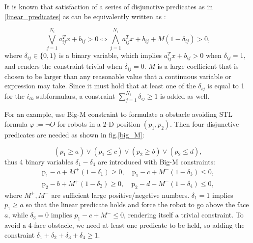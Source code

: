 \documentclass[a4paper]{report}
\begin{document}

It is known that satisfaction of a series of disjunctive predicates as in \ref*{linear_predicates} as can be equivalently written as \cite{Maryam2019}:

\begin{equation}
\bigvee_{j=1}^{N_i} a_{ij}^Tx+b_{ij}>0 \Leftrightarrow \bigwedge_{j=1}^{N_i}a_{ij}^Tx+b_{ij}+M(1-\delta_{ij})>0,
\end{equation}
where $\delta_{ij} \in \{0,1\}$ is a binary variable, which implies $a_{ij}^Tx+b_{ij}>0$ when $\delta_{ij}=1$, and renders the constraint trivial when $\delta_{ij}=0$. $M$ is a large coefficient that is chosen to be larger than any reasonable value that a continuous variable or expression may take. 
Since it must hold that at least one of the $\delta_{ij}$ is equal to 1 for the $i_{th}$ subformulars, a constraint $\sum_{j=1}^{N_i} \delta_{ij} \geq 1$ is added as well. 

For an example, use Big-M constraint to formulate a obstacle avoiding STL formula $\varphi := \lnot O $ for robots in a 2-D position $(p_1,p_2)$. Then four disjunctive predicates are needed as shown in fig.\ref*{big_M}:


\begin{equation}
    (p_1 \geq a) \vee (p_1 \leq c) \vee (p_2 \geq b) \vee (p_2 \leq d),
\end{equation}
thus 4 binary variables $\delta_1 - \delta_4 $ are introduced with Big-M constraints: 
\begin{equation}
\begin{split}
    \mathrm{p}_1-a + M^+\left(1-\delta_1\right)\geq 0,
    \quad \mathrm{p}_1-c + M^-\left(1-\delta_3\right) \leq 0, \\
    \mathrm{p}_2-b + M^+\left(1-\delta_2\right) \geq 0, \quad \mathrm{p}_2-d + M^-\left(1-\delta_4\right) \leq 0,
\end{split}
\label{big-Mconstraints}
\end{equation}
where $M^+,M^-$ are sufficient large positive/negetive numbers. $\delta_1 = 1$ implies $p_1 \geq a$ so that the linear predicate holds and force the robot to go above the face $a$, while $\delta_3 = 0$ implies $p_1 - c +M^-\leq 0$, rendering itself a trivial constraint. To avoid a 4-face obstacle, we need at least one predicate to be held, so adding the constraint $\delta_1+\delta_2+\delta_3+\delta_4 \geq 1$.
\end{document}
